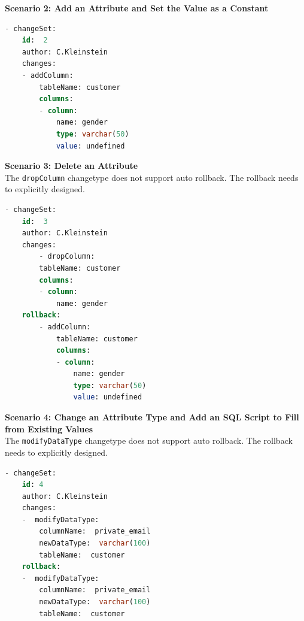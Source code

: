 \textbf{Scenario 2: Add an Attribute and Set the Value as a Constant}\\
%
\begin{lstlisting}[language=SQL, caption={YAML Changeset Scenario 2: Add an Attribute and Set the Value as a Constant}, label=list:scenarions:LiquibaseYAMLScen2]
- changeSet: 
	id:  2
	author: C.Kleinstein
	changes:
	- addColumn:
		tableName: customer
		columns:
		- column:
			name: gender
			type: varchar(50)
			value: undefined
\end{lstlisting}

\textbf{Scenario 3: Delete an Attribute}\\
%
The \texttt{dropColumn} changetype does not support auto rollback. The rollback needs to explicitly designed.
\begin{lstlisting}[language=SQL, caption={SQL Changeset Scenario 3: Delete an Attribute}, label=list:scenarions:LiquibaseSQLScen3]
- changeSet: 
	id:  3
	author: C.Kleinstein
	changes:
		- dropColumn:
		tableName: customer
		columns:
		- column:
			name: gender
	rollback:
        - addColumn:
			tableName: customer
			columns:
			- column:
				name: gender
				type: varchar(50)
				value: undefined
\end{lstlisting}

\textbf{Scenario 4: Change an Attribute Type and Add an SQL Script to Fill from Existing Values}\\
%
The \texttt{modifyDataType} changetype does not support auto rollback. The rollback needs to explicitly designed.
\begin{lstlisting}[language=SQL, caption={SQL Changeset Scenario 4: Change an Attribute Type and Add an SQL Script to Fill from Existing Values}, label=list:scenarions:LiquibaseSQLScen4]
- changeSet:
	id: 4
	author: C.Kleinstein
	changes:  
	-  modifyDataType:    
		columnName:  private_email  
		newDataType:  varchar(100)    
		tableName:  customer
	rollback:
    -  modifyDataType:    
		columnName:  private_email  
		newDataType:  varchar(100)    
		tableName:  customer
\end{lstlisting}

